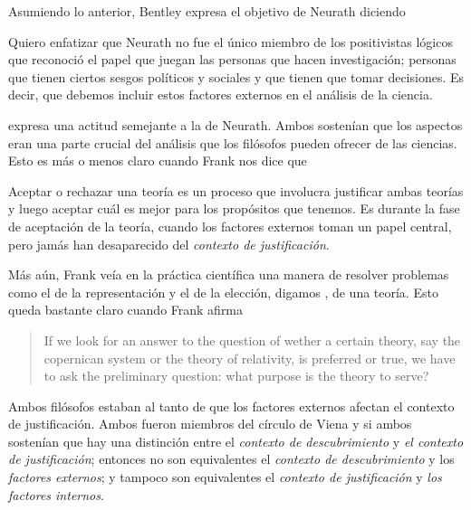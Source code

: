 Asumiendo lo anterior, Bentley expresa el objetivo de Neurath diciendo  \parencite[p. 41]{Bentley2023}

Quiero enfatizar que Neurath no fue el único miembro de los positivistas lógicos que reconoció el papel que juegan las personas que hacen investigación; personas que tienen ciertos sesgos políticos y sociales y que tienen que tomar decisiones.
Es decir, que debemos incluir estos factores externos en el análisis de la ciencia.



 expresa una actitud semejante a la de Neurath.
Ambos sostenían que los aspectos  eran una parte crucial del análisis que los filósofos pueden ofrecer de las ciencias.
Esto es más o menos claro cuando Frank nos dice que  \parencite[p. 143]{Frank1954}

Aceptar o rechazar una teoría es un proceso que involucra justificar ambas teorías y luego aceptar cuál es mejor para los propósitos que tenemos.
Es durante la fase de aceptación de la teoría, cuando los factores externos toman un papel central, pero jamás han desaparecido del \emph{contexto de justificación}.

Más aún, Frank veía en la práctica científica una manera de resolver problemas como el de la representación y el de la elección, digamos , de una teoría.
Esto queda bastante claro cuando Frank afirma 

\begin{quote}
If we look for an answer to the question of wether a certain theory, say the copernican system or the theory of relativity, is preferred or true, we have to ask the preliminary question: what purpose is the theory to serve? \parencite[p. 15]{Frank1954} 
\end{quote}

Ambos filósofos estaban al tanto de que los factores externos afectan el contexto de justificación.
Ambos fueron miembros del círculo de Viena y si ambos sostenían que hay una distinción entre el \emph{contexto de descubrimiento} y \emph{el contexto de justificación}; entonces no son equivalentes el \emph{contexto de descubrimiento} y los \emph{factores externos}; y  tampoco son equivalentes el \emph{contexto de justificación} y \emph{los factores internos}.

